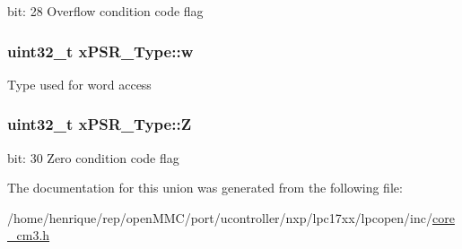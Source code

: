 bit\-: 28 Overflow condition code flag \hypertarget{unionxPSR__Type_a1a47176768f45f79076c4f5b1b534bc2}{
\subsubsection[{w}]{\setlength{\rightskip}{0pt plus 5cm}uint32\-\_\-t x\-P\-S\-R\-\_\-\-Type\-::w}}\label{unionxPSR__Type_a1a47176768f45f79076c4f5b1b534bc2}
Type used for word access \hypertarget{unionxPSR__Type_a1e5d9801013d5146f2e02d9b7b3da562}{
\subsubsection[{Z}]{\setlength{\rightskip}{0pt plus 5cm}uint32\-\_\-t x\-P\-S\-R\-\_\-\-Type\-::\-Z}}\label{unionxPSR__Type_a1e5d9801013d5146f2e02d9b7b3da562}
bit\-: 30 Zero condition code flag 

The documentation for this union was generated from the following file\-:\begin{DoxyCompactItemize}
\item 
/home/henrique/rep/open\-M\-M\-C/port/ucontroller/nxp/lpc17xx/lpcopen/inc/\hyperlink{core__cm3_8h}{core\-\_\-cm3.\-h}\end{DoxyCompactItemize}
